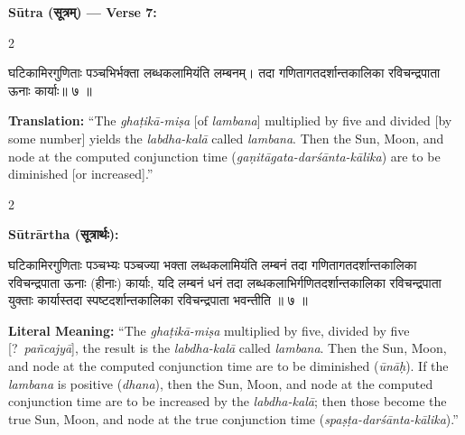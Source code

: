 \documentclass[11pt,a4paper]{article}
\newcommand{\dev}[1]{{\devanagarifont #1}}
\newenvironment{sanskritverse}{%
  \begin{center}\begin{minipage}{0.95\textwidth}
  \setlength{\leftskip}{1em}
  \setlength{\rightskip}{1em}
  \dev
}{\end{minipage}\end{center}}
\begin{document}
\vspace{0.5em}
\noindent\textbf{Sūtra ({\devanagarifont सूत्रम्}) — Verse 7:}

\begin{paracol}{2}

\begin{sanskritverse}
घटिकामिरगुणिताः पञ्चभिर्भक्ता लब्धकलामियंति लम्बनम्।
तदा गणितागतदर्शान्तकालिका रविचन्द्रपाता ऊनाः कार्याः॥ ७ ॥
\end{sanskritverse}

\switchcolumn

\textbf{Translation:} ``The \textit{ghaṭikā-miṣa} [of \textit{lambana}] multiplied by five and divided [by some number] yields the \textit{labdha-kalā} called \textit{lambana}. Then the Sun, Moon, and node at the computed conjunction time (\textit{gaṇitāgata-darśānta-kālika}) are to be diminished [or increased].''

\end{paracol}

\vspace{0.5em}

\begin{paracol}{2}

\noindent\textbf{Sūtrārtha (\dev{सूत्रार्थः}):}
\begin{sanskritverse}
घटिकामिरगुणिताः पञ्चभ्यः पञ्चज्या भक्ता लब्धकलामियंति लम्बनं तदा
गणितागतदर्शान्तकालिका रविचन्द्रपाता ऊनाः (हीनाः) कार्याः, यदि लम्बनं धनं तदा
लब्धकलाभिर्गणितदर्शान्तकालिका रविचन्द्रपाता युक्ताः कार्यास्तदा स्पष्टदर्शान्तकालिका
रविचन्द्रपाता भवन्तीति ॥ ७ ॥
\end{sanskritverse}

\switchcolumn

\textbf{Literal Meaning:} ``The \textit{ghaṭikā-miṣa} multiplied by five, divided by five [?\ \textit{pañcajyā}], the result is the \textit{labdha-kalā} called \textit{lambana}. Then the Sun, Moon, and node at the computed conjunction time are to be diminished (\textit{ūnāḥ}). If the \textit{lambana} is positive (\textit{dhana}), then the Sun, Moon, and node at the computed conjunction time are to be increased by the \textit{labdha-kalā}; then those become the true Sun, Moon, and node at the true conjunction time (\textit{spaṣṭa-darśānta-kālika}).''

\end{paracol}
\end{document}

